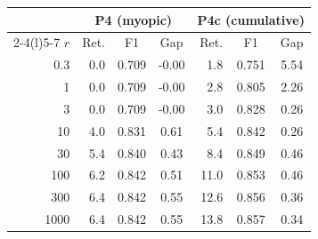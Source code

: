 \begin{tabular}{@{}rrccrcc@{}}
\toprule
 & \multicolumn{3}{c}{P4 (myopic)} & \multicolumn{3}{c}{P4c (cumulative)} \\
\cmidrule(lr){2-4}\cmidrule(l){5-7}
$r$ & Ret. & F1 & Gap & Ret. & F1 & Gap \\
\midrule
0.3 & 0.0 & 0.709 & -0.00 & 1.8 & 0.751 & 5.54 \\
1 & 0.0 & 0.709 & -0.00 & 2.8 & 0.805 & 2.26 \\
3 & 0.0 & 0.709 & -0.00 & 3.0 & 0.828 & 0.26 \\
10 & 4.0 & 0.831 & 0.61 & 5.4 & 0.842 & 0.26 \\
30 & 5.4 & 0.840 & 0.43 & 8.4 & 0.849 & 0.46 \\
100 & 6.2 & 0.842 & 0.51 & 11.0 & 0.853 & 0.46 \\
300 & 6.4 & 0.842 & 0.55 & 12.6 & 0.856 & 0.36 \\
1000 & 6.4 & 0.842 & 0.55 & 13.8 & 0.857 & 0.34 \\
\bottomrule
\end{tabular}
